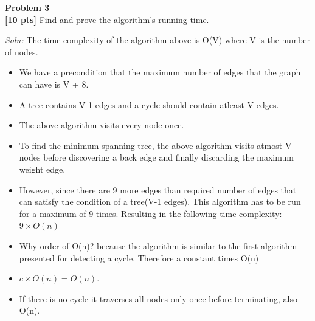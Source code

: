 \documentclass{article}
\newenvironment{problem}[2][Problem]
    { \begin{mdframed}[backgroundcolor=gray!20] \textbf{#1 #2} \\}
    {  \end{mdframed}}
\newenvironment{solution}
    {\textit{Soln:}}
    {}
\begin{document}
\begin{problem}{3}
\textbf{[10 pts]} Find and prove the algorithm's running time.
\end{problem}
\begin{solution}
The time complexity of the algorithm above is O(V) where V is the number of nodes.
\begin{itemize}
\item We have a precondition that the maximum number of edges that the graph can have is V + 8.
\item 
A tree contains V-1 edges and a cycle should contain atleast V edges.
\item The above algorithm visits every node once.
\item To find the minimum spanning tree, the above algorithm visits atmost V nodes before discovering a back edge and finally discarding the maximum weight edge.
\item However, since there are 9 more edges than required number of edges that can satisfy the condition of a tree(V-1 edges). This algorithm has to be run for a maximum of 9 times. Resulting in the following time complexity:
$9 \times O(n)$

\item Why order of O(n)? because the algorithm is similar to the first algorithm presented for detecting a cycle.
Therefore a constant times O(n) 
\item $c \times O(n) = O(n)$.
\item If there is no cycle it traverses all nodes only once before terminating, also O(n).
\end{itemize}
\end{solution}
\end{document}
